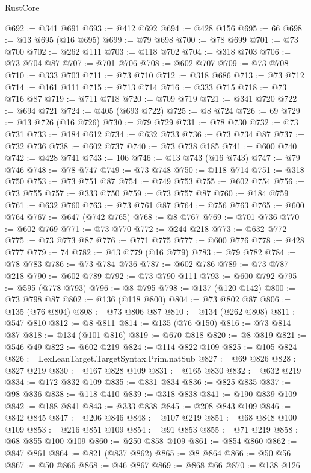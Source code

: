 \begin{lexlean}{RustCore}
\begin{coremodule}
@692 := @341 @691
@693 := @412 @692
@694 := @428 @156
@695 := 66
@698 := @13 @695 (@16 @695)
@699 := @79 @698
@700 := @78 @699
@701 := @73 @700
@702 := @262 @111
@703 := @118 @702
@704 := @318 @703
@706 := @73 @704 @87
@707 := @701 @706
@708 := @602 @707
@709 := @73 @708
@710 := @333 @703
@711 := @73 @710
@712 := @318 @686
@713 := @73 @712
@714 := @161 @111
@715 := @713 @714
@716 := @333 @715
@718 := @73 @716 @87
@719 := @711 @718
@720 := @709 @719
@721 := @341 @720
@722 := @694 @721
@724 := @405 (@693 @722)
@725 := @8 @724
@726 := 69
@729 := @13 @726 (@16 @726)
@730 := @79 @729
@731 := @78 @730
@732 := @73 @731
@733 := @184 @612
@734 := @632 @733
@736 := @73 @734 @87
@737 := @732 @736
@738 := @602 @737
@740 := @73 @738 @185
@741 := @600 @740
@742 := @428 @741
@743 := 106
@746 := @13 @743 (@16 @743)
@747 := @79 @746
@748 := @78 @747
@749 := @73 @748
@750 := @118 @714
@751 := @318 @750
@753 := @73 @751 @87
@754 := @749 @753
@755 := @602 @754
@756 := @73 @755
@757 := @333 @750
@759 := @73 @757 @87
@760 := @184 @759
@761 := @632 @760
@763 := @73 @761 @87
@764 := @756 @763
@765 := @600 @764
@767 := @647 (@742 @765)
@768 := @8 @767
@769 := @701 @736
@770 := @602 @769
@771 := @73 @770
@772 := @244 @218
@773 := @632 @772
@775 := @73 @773 @87
@776 := @771 @775
@777 := @600 @776
@778 := @428 @777
@779 := 74
@782 := @13 @779 (@16 @779)
@783 := @79 @782
@784 := @78 @783
@786 := @73 @784 @736
@787 := @602 @786
@789 := @73 @787 @218
@790 := @602 @789
@792 := @73 @790 @111
@793 := @600 @792
@795 := @595 (@778 @793)
@796 := @8 @795
@798 := @137 (@120 @142)
@800 := @73 @798 @87
@802 := @136 (@118 @800)
@804 := @73 @802 @87
@806 := @135 (@76 @804)
@808 := @73 @806 @87
@810 := @134 (@262 @808)
@811 := @547 @810
@812 := @8 @811
@814 := @135 (@76 @150)
@816 := @73 @814 @87
@818 := @134 (@101 @816)
@819 := @670 @818
@820 := @8 @819
@821 := @546 @49
@822 := @602 @219
@824 := @114 @822 @109
@825 := @105 @824
@826 := LexLeanTarget.TargetSyntax.Prim.natSub
@827 := @69 @826
@828 := @827 @219
@830 := @167 @828 @109
@831 := @165 @830
@832 := @632 @219
@834 := @172 @832 @109
@835 := @831 @834
@836 := @825 @835
@837 := @98 @836
@838 := @118 @410
@839 := @318 @838
@841 := @190 @839 @109
@842 := @188 @841
@843 := @333 @838
@845 := @208 @843 @109
@846 := @842 @845
@847 := @206 @846
@848 := @107 @219
@851 := @68 @848 @100 @109
@853 := @216 @851 @109
@854 := @91 @853
@855 := @71 @219
@858 := @68 @855 @100 @109
@860 := @250 @858 @109
@861 := @854 @860
@862 := @847 @861
@864 := @821 (@837 @862)
@865 := @8 @864
@866 := @50 @56
@867 := @50 @866
@868 := @46 @867
@869 := @868 @66
@870 := @138 @126

\end{coremodule}
\end{lexlean}
